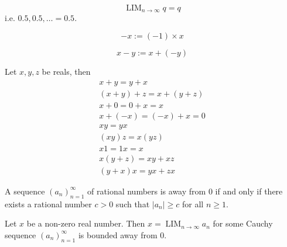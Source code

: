 \documentclass{blog}
\DeclareMathOperator{\LIM}{LIM}
\begin{document}
\begin{definition}[rational = real]
  \begin{equation}
    \LIM_{n \to \infty} q = q
  \end{equation}
  i.e. $0.5, 0.5, \dots = 0.5$.
\end{definition}

\begin{definition}[negation]
  \begin{equation}
    -x := (-1) \times x
  \end{equation}
\end{definition}

\begin{definition}[subtraction]
  \begin{equation}
    x - y := x + (-y)
  \end{equation}
\end{definition}

\begin{proposition}
  Let $x, y, z$ be reals, then
  \begin{gather}
    x + y = y + x \\
    (x + y) + z = x + (y + z) \\
    x + 0 = 0 + x = x \\
    x + (-x) = (-x) + x = 0 \\
    x y = y x \\
    (x y) z = x (y z) \\
    x 1 = 1 x = x \\
    x (y + z) = x y + x z \\
    (y + x) x = y x + z x
  \end{gather}
\end{proposition}

\begin{definition}
  A sequence $(a_{n})_{n = 1}^{\infty}$ of rational numbers is away from 0 if and only if
  there exists a rational number $c > 0$ such that $|a_{n}| \geq c$ for all $n \geq 1$.
\end{definition}

\begin{lemma}
  Let $x$ be a non-zero real number.
  Then $x = \LIM_{n \to \infty} a_{n}$ for some Cauchy sequence $(a_{n})_{n = 1}^{\infty}$
  is bounded away from 0.
\end{lemma}
\end{document}
